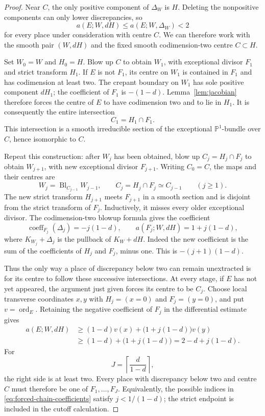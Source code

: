 \begin{proof}
Near $C$, the only positive component of $\Delta_W$ is $H$.
Deleting the nonpositive components can only lower discrepancies, so
\[
 a(E;W,dH)\leq a(E;W,\Delta_W)<2
\]
for every place under consideration with centre $C$.  We can therefore
work with the smooth pair $(W,dH)$ and the fixed smooth codimension-two
centre $C\subset H$.

Set $W_0=W$ and $H_0=H$.  Blow up $C$ to obtain $W_1$, with exceptional
divisor $F_1$ and strict transform $H_1$.  If $E$ is not $F_1$, its
centre on $W_1$ is contained in $F_1$ and has codimension at least two.
The crepant boundary on $W_1$ has sole positive component $dH_1$; the
coefficient of $F_1$ is $-(1-d)$.  Lemma~\ref{lem:jacobian} therefore
forces the centre of $E$ to have codimension two and to lie in $H_1$.
It is consequently the entire intersection
\[
 C_1=H_1\cap F_1.
\]
This intersection is a smooth irreducible section of the exceptional
$\mathbb P^1$-bundle over $C$, hence isomorphic to $C$.

Repeat this construction: after $W_j$ has been obtained, blow up
$C_j=H_j\cap F_j$ to obtain $W_{j+1}$, with new exceptional divisor
$F_{j+1}$.  Writing $C_0=C$, the maps and
their centres are
\begin{equation}\label{eq:forced-centres}
 W_j=\operatorname{Bl}_{C_{j-1}}W_{j-1},\qquad
 C_j=H_j\cap F_j\simeq C_{j-1}\qquad(j\geq1).
\end{equation}
The new strict transform
$H_{j+1}$ meets $F_{j+1}$ in a smooth section and is disjoint from the
strict transform of $F_j$.  Inductively, it misses every older exceptional
divisor.  The codimension-two blowup formula gives the coefficient
\begin{equation}
 \operatorname{coeff}_{F_j}(\Delta_j)=-j(1-d),
 \qquad a(F_j;W,dH)=1+j(1-d),
 \label{eq:forced-chain-coefficients}
\end{equation}
where $K_{W_j}+\Delta_j$ is the pullback of $K_W+dH$.
Indeed the new coefficient is the sum of the coefficients of $H_j$ and
$F_j$, minus one.  This is $-(j+1)(1-d)$.

Thus the only way a place of discrepancy below two can remain
unextracted is for its centre to follow these successive intersections.
At every stage, if $E$ has not yet appeared, the argument just given
forces its centre to be $C_j$.  Choose local transverse coordinates
$x,y$ with $H_j=(x=0)$ and $F_j=(y=0)$, and put
$v=\operatorname{ord}_E$.  Retaining the negative coefficient of $F_j$
in the differential estimate gives
\begin{equation}
 \begin{split}
 a(E;W,dH)&\geq (1-d)v(x)+\bigl(1+j(1-d)\bigr)v(y)\\
          &\geq (1-d)+\bigl(1+j(1-d)\bigr)
            =2-d+j(1-d).
 \end{split}
 \label{eq:forced-chain-cutoff}
\end{equation}
For
\[
 J=\left\lceil\frac{d}{1-d}\right\rceil,
\]
the right side is at least two.  Every place with discrepancy below two
and centre $C$ must therefore be one of $F_1,\ldots,F_J$.  Equivalently,
the possible indices in \eqref{eq:forced-chain-coefficients} satisfy
$j<1/(1-d)$; the strict endpoint is included in the cutoff calculation.


\end{proof}
